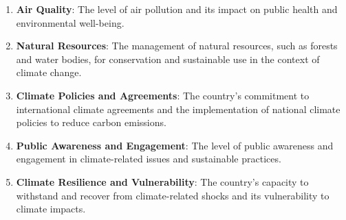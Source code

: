 \begin{enumerate}
  \item \textbf{Air Quality}: The level of air pollution and its
  impact on public health and environmental well-being.
  
  \item \textbf{Natural Resources}: The management of natural
  resources, such as forests and water bodies, for conservation
  and sustainable use in the context of climate change.
  
  \item \textbf{Climate Policies and Agreements}: The country's
  commitment to international climate agreements and the
  implementation of national climate policies to reduce carbon
  emissions.
  
  \item \textbf{Public Awareness and Engagement}: The level of
  public awareness and engagement in climate-related issues and
  sustainable practices.
  
  \item \textbf{Climate Resilience and Vulnerability}: The country's
  capacity to withstand and recover from climate-related shocks and
  its vulnerability to climate impacts.
\end{enumerate}


